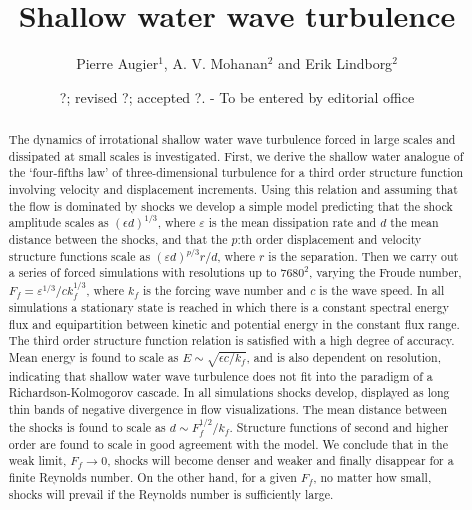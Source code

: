 \documentclass{jfm}
\title[Shallow water wave turbulence]%
{ Shallow water wave turbulence}
\author[P. Augier, A.V. Mohanan and E. Lindborg]%
{Pierre Augier$^{1}$,   A. V. Mohanan$^{2}$
and Erik Lindborg$^2$ \ns }
\affiliation{$^2$ KTH Mechanics,
SE-100 44 Stockholm, Sweden\\[\affilskip]
$^1$ LEGI, BP53,
38041 Grenoble Cedex, France}
\date{?; revised ?; accepted ?. - To be entered by editorial office}
\newcommand{\eps}{\varepsilon}
\begin{document}
\maketitle



\begin{abstract}

The dynamics of irrotational shallow water wave turbulence forced in large
scales and dissipated at small scales is investigated. First, we derive the
shallow water analogue of the `four-fifths law' of three-dimensional turbulence
for a third order structure function involving velocity and displacement
increments. Using this relation and assuming that the flow is dominated by
shocks we develop a simple model predicting that the shock amplitude scales as
$ (\epsilon d)^{1/3} $, where $ \eps $ is the mean dissipation rate and $ d $
the mean distance between the shocks, and that the $ p $:th order displacement
and velocity structure functions scale as $ (\eps d)^{p/3} r/d $, where $ r $
is the separation. Then we carry out a series of forced simulations with
resolutions up to $7680^2$, varying the Froude number, $F_{f} = \eps^{1/3} /
ck_f^{1/3} $, where $ k_f $ is the forcing wave number and $c$ is the wave
speed. In all simulations a stationary state is reached in which there is a
constant spectral energy flux and equipartition between kinetic and potential
energy in the constant flux range. The third order structure function relation
is satisfied with a high degree of accuracy. Mean energy is found to scale as $
E \sim \sqrt{\epsilon c/k_f} $, and is also dependent on resolution, indicating
that shallow water wave turbulence does not fit into the paradigm of a
Richardson-Kolmogorov cascade. In all simulations shocks develop, displayed as
long thin bands of negative divergence in flow visualizations. The mean
distance between the shocks is found to scale as $ d \sim F_f^{1/2}/k_f $.
Structure functions of second and higher order are found to scale in good
agreement with the model. We conclude that in the weak limit, $ F_f \rightarrow
0 $, shocks will become denser and weaker and finally disappear for a finite
Reynolds number. On the other hand, for a given $ F_{f} $, no matter how small,
shocks will prevail if the Reynolds number is sufficiently large.

\end{abstract}

\end{document}
